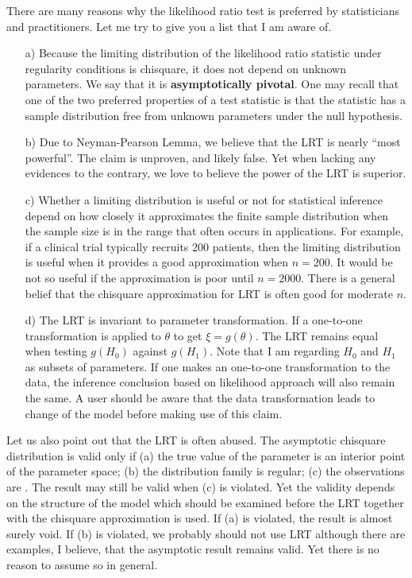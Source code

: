 \vs
There are many reasons why the likelihood ratio test is preferred by
statisticians and practitioners. Let me try to give you a list that I am
aware of.

\begin{itemize}
\item[a)] 
Because the limiting distribution of the likelihood ratio statistic
under regularity conditions is chisquare, it does not depend on
unknown parameters. We say that it is {\bf asymptotically pivotal}.
One may recall that one of the two preferred properties of a test
statistic is that the statistic has a sample distribution free from
unknown parameters under the null hypothesis.

\item[b)] 
Due to Neyman-Pearson Lemma, we believe that the LRT is
nearly ``most powerful''. The claim is unproven, and likely false.
Yet when lacking any evidences to the contrary, we love to believe the
power of the LRT is superior.

\item[c)] 
Whether a limiting distribution is useful or not for statistical
inference depend on how
closely it approximates the finite sample distribution when the
sample size is in the range that often occurs in applications. For example,
if a clinical trial typically recruits 200 patients, then the limiting
distribution is useful when it provides a good approximation when
$n=200$. It would be not so useful if the approximation is poor
until $n=2000$. There is a general belief that the chisquare approximation
for LRT is often good for moderate $n$.

\item[d)] 
The LRT is invariant to parameter transformation. If a one-to-one
transformation is applied to $\theta$ to get $\xi  = g(\theta)$.
The LRT remains equal when testing $g(H_0)$ against $g(H_1)$.
Note that I am regarding $H_0$ and $H_1$ as subsets of
parameters. If one makes an one-to-one transformation to the
data, the inference conclusion based on likelihood approach
will also remain the same.
A user should be aware that the data transformation leads to
change of the model before making use of this claim.
\end{itemize}

Let us also point out that the LRT is often
abused. The asymptotic chisquare distribution is valid only if
(a) the true value of the parameter is an interior point of the
parameter space; (b) the distribution family is regular; (c)
the observations are \iid. The result may still be valid when (c)
is violated. Yet the validity depends on the structure of the model 
which should be examined before the LRT together
with the chisquare approximation is used. If (a) is violated,
the result is almost surely void. If (b) is violated, we probably should
not use LRT although there are examples, I believe, that the
asymptotic result remains valid. Yet there is no reason to assume
so in general.

